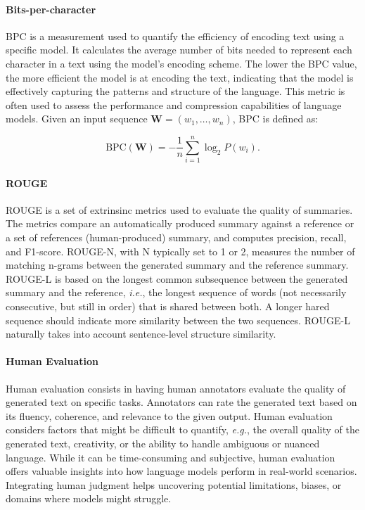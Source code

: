 \paragraph{Bits-per-character} \ac{BPC} is a measurement used to quantify the efficiency of encoding text using a specific model. It calculates the average number of bits needed to represent each character in a text using the model's encoding scheme. The lower the \ac{BPC} value, the more efficient the model is at encoding the text, indicating that the model is effectively capturing the patterns and structure of the language. This metric is often used to assess the performance and compression capabilities of language models. Given an input sequence $\bm{W} = (w_1, \ldots, w_n)$, \ac{BPC} is defined as:

\begin{equation}
    \text{BPC}(\bm{W}) = - \dfrac{1}{n} \sum_{i=1}^n \log_2 P(w_i).
\end{equation}

\paragraph{ROUGE} 

\ac{ROUGE} \citep{lin2004rouge} is a set of extrinsinc metrics used to evaluate the quality of summaries. The metrics compare an automatically produced summary against a reference or a set of references (human-produced) summary, and computes precision, recall, and F1-score. \ac{ROUGE}-N, with N typically set to 1 or 2, measures the number of matching n-grams between the generated summary and the reference summary. \ac{ROUGE}-L is based on the longest common subsequence between the generated summary and the reference, \textit{i.e.}, the longest sequence of words (not necessarily consecutive, but still in order) that is shared between both. A longer hared sequence should indicate more similarity between the two sequences. \ac{ROUGE}-L naturally takes into account sentence-level structure similarity.

\paragraph{Human Evaluation}

Human evaluation consists in having human annotators evaluate the quality of generated text on specific tasks. Annotators can rate the generated text based on its fluency, coherence, and relevance to the given output. Human evaluation considers factors that might be difficult to quantify, \textit{e.g.}, the overall quality of the generated text, creativity, or the ability to handle ambiguous or nuanced language. While it can be time-consuming and subjective, human evaluation offers valuable insights into how language models perform in real-world scenarios. Integrating human judgment helps uncovering potential limitations, biases, or domains where models might struggle.
 
